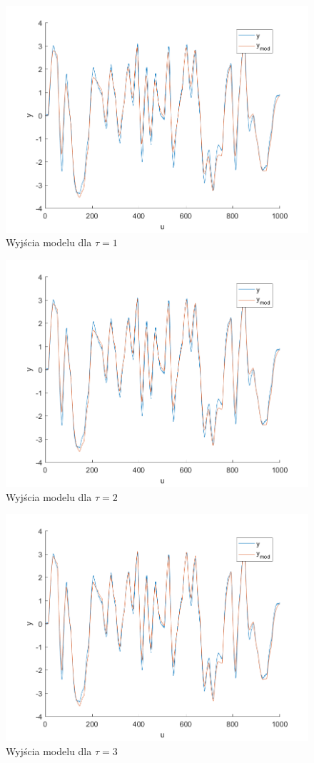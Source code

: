\documentclass[a4paper, 10pt]{article}
\begin{document}
	\begin{figure}[H]
	\centering
	\includegraphics[width=0.9\linewidth]{z1_1}
	\caption{Wyjścia modelu dla $\tau=1$}
	\label{fig:z1_1}
	\end{figure}
	\begin{figure}[H]
	\centering
	\includegraphics[width=0.9\linewidth]{z1_2}
	\caption{Wyjścia modelu dla $\tau=2$}
	\label{fig:z1_2}
	\end{figure}
	\begin{figure}[H]
	\centering
	\includegraphics[width=0.9\linewidth]{z1_3}
	\caption{Wyjścia modelu dla $\tau=3$}
	\label{fig:z1_3}
	\end{figure}
\end{document}
